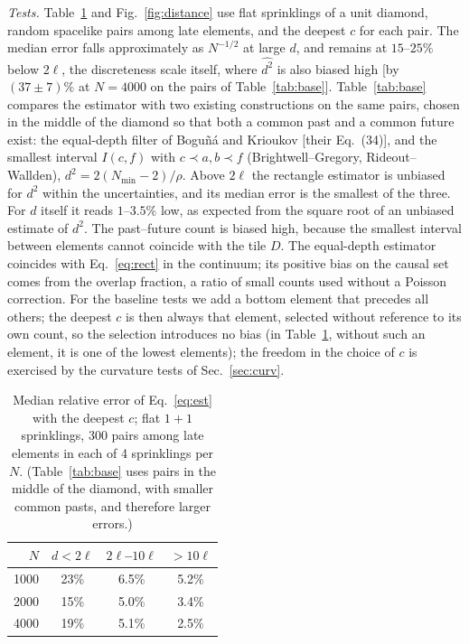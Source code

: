\documentclass[prd,twocolumn,superscriptaddress,nofootinbib,amsmath,amssymb,floatfix]{revtex4-2}
\begin{document}
\emph{Tests.} Table~\ref{tab:dist} and Fig.~\ref{fig:distance} use flat sprinklings of a unit diamond, random spacelike pairs among late elements, and the deepest $c$ for each pair. The median error falls approximately as $N^{-1/2}$ at large $d$, and remains at $15$--$25\%$ below $2\ell$, the discreteness scale itself, where $\widehat{d^2}$ is also biased high [by $(37\pm7)\%$ at $N=4000$ on the pairs of Table~\ref{tab:base}]. Table~\ref{tab:base} compares the estimator with two existing constructions on the same pairs, chosen in the middle of the diamond so that both a common past and a common future exist: the equal-depth filter of Bogu\~n\'a and Krioukov [their Eq.~(34)], and the smallest interval $I(c,f)$ with $c\prec a,b\prec f$ (Brightwell--Gregory, Rideout--Wallden), $d^2=2(N_{\min}-2)/\rho$. Above $2\ell$ the rectangle estimator is unbiased for $d^2$ within the uncertainties, and its median error is the smallest of the three. For $d$ itself it reads $1$--$3.5\%$ low, as expected from the square root of an unbiased estimate of $d^2$. The past--future count is biased high, because the smallest interval between elements cannot coincide with the tile $D$. The equal-depth estimator coincides with Eq.~\eqref{eq:rect} in the continuum; its positive bias on the causal set comes from the overlap fraction, a ratio of small counts used without a Poisson correction. For the baseline tests we add a bottom element that precedes all others; the deepest $c$ is then always that element, selected without reference to its own count, so the selection introduces no bias (in Table~\ref{tab:dist}, without such an element, it is one of the lowest elements); the freedom in the choice of $c$ is exercised by the curvature tests of Sec.~\ref{sec:curv}.

\begin{table}[t]
\caption{Median relative error of Eq.~\eqref{eq:est} with the deepest $c$; flat $1+1$ sprinklings, 300 pairs among late elements in each of 4 sprinklings per $N$. (Table~\ref{tab:base} uses pairs in the middle of the diamond, with smaller common pasts, and therefore larger errors.)}
\label{tab:dist}
\begin{ruledtabular}
\begin{tabular}{rccc}
$N$ & $d<2\ell$ & $2\ell$--$10\ell$ & $>10\ell$\\
\hline
1000 & 23\% & 6.5\% & 5.2\%\\
2000 & 15\% & 5.0\% & 3.4\%\\
4000 & 19\% & 5.1\% & 2.5\%\\
\end{tabular}
\end{ruledtabular}
\end{table}
\end{document}
